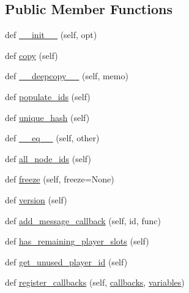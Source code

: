 \subsection*{Public Member Functions}
\begin{DoxyCompactItemize}
\item 
def \hyperlink{classlight__chats_1_1graph_1_1Graph_a5bd7cc4e21edc98dcbbac1040f68c878}{\+\_\+\+\_\+init\+\_\+\+\_\+} (self, opt)
\item 
def \hyperlink{classlight__chats_1_1graph_1_1Graph_a4897dcda9b389f41be824fdffce5055b}{copy} (self)
\item 
def \hyperlink{classlight__chats_1_1graph_1_1Graph_a1fc2b40195b1c7d3ed3a26dbd26fe79b}{\+\_\+\+\_\+deepcopy\+\_\+\+\_\+} (self, memo)
\item 
def \hyperlink{classlight__chats_1_1graph_1_1Graph_a604091edb800be1aad16f3a64f13d6da}{populate\+\_\+ids} (self)
\item 
def \hyperlink{classlight__chats_1_1graph_1_1Graph_a5f54739484e05010202517a4714af30f}{unique\+\_\+hash} (self)
\item 
def \hyperlink{classlight__chats_1_1graph_1_1Graph_a56d79ef43ac8f25d399228cc57f5fa25}{\+\_\+\+\_\+eq\+\_\+\+\_\+} (self, other)
\item 
def \hyperlink{classlight__chats_1_1graph_1_1Graph_a1200144ee93bfb6e3abae4a41ba10cf0}{all\+\_\+node\+\_\+ids} (self)
\item 
def \hyperlink{classlight__chats_1_1graph_1_1Graph_aa61c4fbc35d423277f0755cd8a16a43f}{freeze} (self, freeze=None)
\item 
def \hyperlink{classlight__chats_1_1graph_1_1Graph_a7094a23385f250b9ea06d07c515ad14c}{version} (self)
\item 
def \hyperlink{classlight__chats_1_1graph_1_1Graph_ad445b8282327b777a3419b2a5309237a}{add\+\_\+message\+\_\+callback} (self, id, func)
\item 
def \hyperlink{classlight__chats_1_1graph_1_1Graph_a43ff743c3d16850dc7d68d809c88c97d}{has\+\_\+remaining\+\_\+player\+\_\+slots} (self)
\item 
def \hyperlink{classlight__chats_1_1graph_1_1Graph_a89bb38305c3d42c4ce2ae8dcc966ab6e}{get\+\_\+unused\+\_\+player\+\_\+id} (self)
\item 
def \hyperlink{classlight__chats_1_1graph_1_1Graph_aa40b8fea9737da5d3f329dfb00c42c6f}{register\+\_\+callbacks} (self, \hyperlink{classlight__chats_1_1graph_1_1Graph_a95a1a4d31dbd607eebd593579b2d6cdd}{callbacks}, \hyperlink{classlight__chats_1_1graph_1_1Graph_a29a00f3191fb45f73bd784ed12cc2c2e}{variables})

\end{DoxyCompactItemize}
